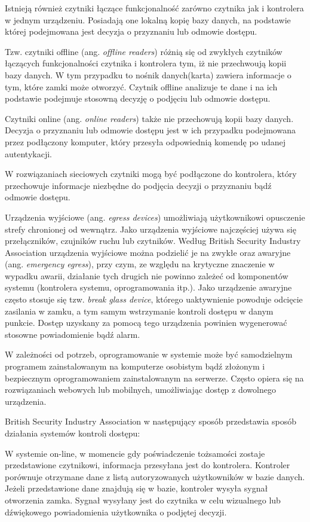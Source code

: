 		Istnieją również czytniki łączące funkcjonalność zarówno czytnika jak i kontrolera w jednym urządzeniu. Posiadają one lokalną kopię bazy danych, na podstawie której podejmowana jest decyzja o przyznaniu lub odmowie dostępu.

		Tzw. czytniki offline (ang. \textit{offline readers}) różnią się od zwykłych czytników łączących funkcjonalności czytnika i kontrolera tym, iż nie przechwoują kopii bazy danych. W tym przypadku to nośnik danych(karta) zawiera informacje o tym, które zamki może otworzyć. Czytnik offline analizuje te dane i na ich podstawie podejmuje stosowną decyzję o podjęciu lub odmowie dostępu.

		Czytniki online (ang. \textit{online readers}) także nie przechowują kopii bazy danych. Decyzja o przyznaniu lub odmowie dostępu jest w ich przypadku podejmowana przez podłączony komputer, który przesyła odpowiednią komendę po udanej autentykacji.

		W rozwiązaniach sieciowych czytniki mogą być podłączone do kontrolera, który przechowuje informacje niezbędne do podjęcia decyzji o przyznaniu bądź odmowie dostępu.

		Urządzenia wyjściowe (ang. \textit{egress devices}) umożliwiają użytkownikowi opusczenie strefy chronionej od wewnątrz. Jako urządzenia wyjściowe najczęściej używa się przełączników, czujników ruchu lub czytników. Według British Security Industry Association urządzenia wyjściowe można podzielić je na zwykłe oraz awaryjne (ang. \textit{emergency egress}), przy czym, ze względu na krytyczne znaczenie w wypadku awarii, działanie tych drugich nie powinno zależeć od komponentów systemu (kontrolera systemu, oprogramowania itp.). Jako urządzenie awaryjne często stosuje się tzw. \textit{break glass device}, którego uaktywnienie powoduje odcięcie zasilania w zamku, a tym samym wstrzymanie kontroli dostępu w danym punkcie. Dostęp uzyskany za pomocą tego urządzenia powinien wygenerować stosowne powiadomienie bądź alarm.

		W zależności od potrzeb, oprogramowanie w systemie może być samodzielnym programem zainstalowanym na komputerze osobistym bądź złożonym i bezpiecznym oprogramowaniem zainstalowanym na serwerze. Często opiera się na rozwiązaniach webowych lub mobilnych, umożliwiając dostęp z dowolnego urządzenia.

		British Security Industry Association w następujący sposób przedstawia sposób działania systemów kontroli dostępu:

		W systemie on-line, w momencie gdy poświadczenie tożsamości zostaje przedstawione czytnikowi, informacja przesyłana jest do kontrolera. Kontroler porównuje otrzymane dane z listą autoryzowanych użytkowników w bazie danych. Jeżeli przedstawione dane znajdują się w bazie, kontroler wysyła sygnał otworzenia zamka. Sygnał wysyłany jest do czytnika w celu wizualnego lub dźwiękowego powiadomienia użytkownika o podjętej decyzji.

